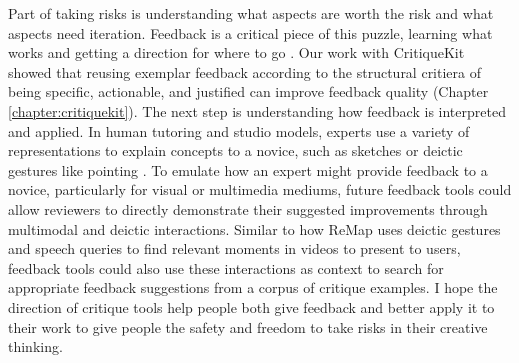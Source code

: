 Part of taking risks is understanding what aspects are worth the risk and what aspects need iteration. Feedback is a critical piece of this puzzle, learning what works and getting a direction for where to go \cite{Hattie2007,sadler1989formative}. Our work with CritiqueKit showed that reusing exemplar feedback according to the structural critiera of being specific, actionable, and justified can improve feedback quality (Chapter \ref{chapter:critiquekit}). The next step is understanding how feedback is interpreted and applied. In human tutoring and studio models, experts use a variety of representations to explain concepts to a novice, such as sketches or deictic gestures like pointing \cite{goldin1999,schon1984reflective,Tversky2011}. To emulate how an expert might provide feedback to a novice, particularly for visual or multimedia mediums, future feedback tools could allow reviewers to directly demonstrate their suggested improvements through multimodal and deictic interactions. Similar to how ReMap \cite{fraser2020remap} uses deictic gestures and speech queries to find relevant moments in videos to present to users, feedback tools could also use these interactions as context to search for appropriate feedback suggestions from a corpus of critique examples. I hope the direction of critique tools help people both give feedback and better apply it to their work to give people the safety and freedom to take risks in their creative thinking.


 
